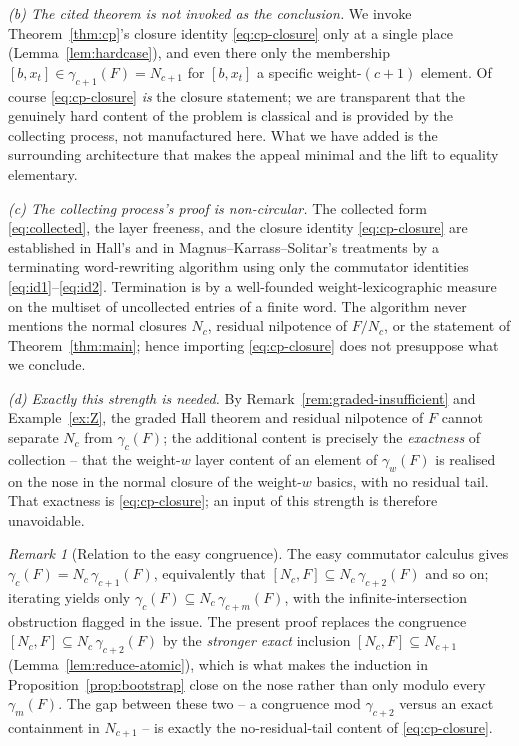 \documentclass{amsart}
\theoremstyle{definition}
\theoremstyle{remark}
\newtheorem{remark}{Remark}
\begin{document}
\emph{(b) The cited theorem is not invoked as the conclusion.} We invoke
Theorem~\ref{thm:cp}'s closure identity \eqref{eq:cp-closure} only at a single
place (Lemma~\ref{lem:hardcase}), and even there only the membership
$[b,x_t]\in\gamma_{c+1}(F)=N_{c+1}$ for $[b,x_t]$ a specific weight-$(c+1)$
element. Of course \eqref{eq:cp-closure} \emph{is} the closure statement; we are
transparent that the genuinely hard content of the problem is classical and is
provided by the collecting process, not manufactured here. What we have added is
the surrounding architecture that makes the appeal minimal and the lift to equality
elementary.

\emph{(c) The collecting process's proof is non-circular.} The collected form
\eqref{eq:collected}, the layer freeness, and the closure identity
\eqref{eq:cp-closure} are established in Hall's and in Magnus--Karrass--Solitar's
treatments by a terminating word-rewriting algorithm using only the commutator
identities \eqref{eq:id1}--\eqref{eq:id2}. Termination is by a well-founded
weight-lexicographic measure on the multiset of uncollected entries of a finite
word. The algorithm never mentions the normal closures $N_c$, residual nilpotence
of $F/N_c$, or the statement of Theorem~\ref{thm:main}; hence importing
\eqref{eq:cp-closure} does not presuppose what we conclude.

\emph{(d) Exactly this strength is needed.} By
Remark~\ref{rem:graded-insufficient} and Example~\ref{ex:Z}, the graded Hall
theorem and residual nilpotence of $F$ cannot separate $N_c$ from $\gamma_c(F)$;
the additional content is precisely the \emph{exactness} of collection -- that the
weight-$w$ layer content of an element of $\gamma_w(F)$ is realised on the nose in
the normal closure of the weight-$w$ basics, with no residual tail. That exactness
is \eqref{eq:cp-closure}; an input of this strength is therefore unavoidable.

\begin{remark}[Relation to the easy congruence]
The easy commutator calculus gives $\gamma_c(F)=N_c\,\gamma_{c+1}(F)$, equivalently
that $[N_c,F]\subseteq N_c\,\gamma_{c+2}(F)$ and so on; iterating yields only
$\gamma_c(F)\subseteq N_c\,\gamma_{c+m}(F)$, with the infinite-intersection
obstruction flagged in the issue. The present proof replaces the congruence
$[N_c,F]\subseteq N_c\,\gamma_{c+2}(F)$ by the \emph{stronger exact} inclusion
$[N_c,F]\subseteq N_{c+1}$ (Lemma~\ref{lem:reduce-atomic}), which is what makes the
induction in Proposition~\ref{prop:bootstrap} close on the nose rather than only
modulo every $\gamma_m(F)$. The gap between these two -- a congruence mod
$\gamma_{c+2}$ versus an exact containment in $N_{c+1}$ -- is exactly the
no-residual-tail content of \eqref{eq:cp-closure}.
\end{remark}
\end{document}
